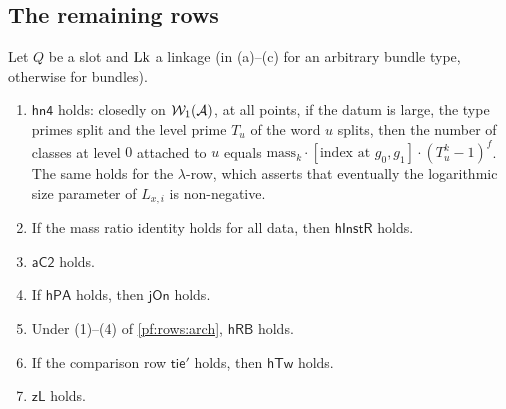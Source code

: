 \subsection{The remaining rows}\label{sec:pf:rows:small}

\begin{proposition}\label{pf:rows:small}
Let $Q$ be a slot and $\mathrm{Lk}$ a linkage (in (a)--(c) for an arbitrary bundle type, otherwise for bundles).
\begin{enumerate}[label=(\alph*)]
\item $\mathsf{hn4}$ holds: closedly on $\mathcal{W}_1(\mathcal A)$, at all points, if the datum is large, the type primes split
and the level prime $T_u$ of the word $u$ splits, then the number of classes at level $0$ attached to $u$ equals
$\mathrm{mass}_k\cdot[\text{index at }g_0,g_1]\cdot(T_u^k-1)^f$. The same holds for the $\lambda$-row, which asserts that
eventually the logarithmic size parameter of $L_{x,i}$ is non-negative.
\item If the mass ratio identity holds for all data, then $\mathsf{hInstR}$ holds.
\item $\mathsf{aC2}$ holds.
\item If $\mathsf{hPA}$ holds, then $\mathsf{jOn}$ holds.
\item Under (1)--(4) of \cref{pf:rows:arch}, $\mathsf{hRB}$ holds.
\item If the comparison row $\mathsf{tie}'$ holds, then $\mathsf{hTw}$ holds.
\item $\mathsf{zL}$ holds.
\end{enumerate}
\end{proposition}

